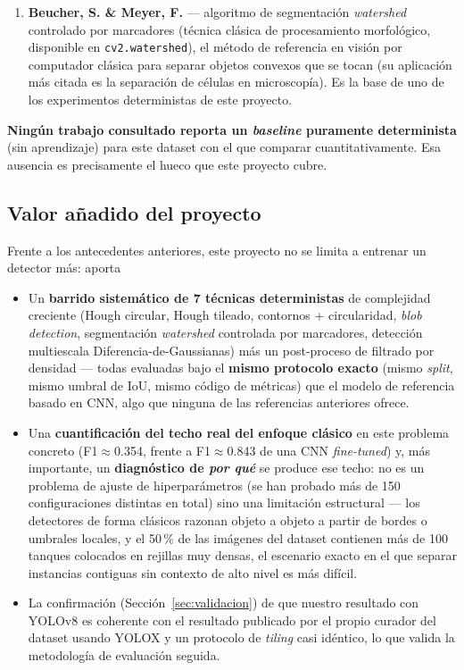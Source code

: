 \documentclass[11pt,a4paper]{article}
\begin{document}
\begin{enumerate}
    \item \textbf{Beucher, S. \& Meyer, F.} --- algoritmo de segmentación
    \emph{watershed} controlado por marcadores \cite{beucher1993watershed} (técnica
    clásica de procesamiento morfológico, disponible en \texttt{cv2.watershed}), el
    método de referencia en visión por computador clásica para separar objetos
    convexos que se tocan (su aplicación más citada es la separación de células en
    microscopía). Es la base de uno de los experimentos deterministas de este
    proyecto.
\end{enumerate}

\textbf{Ningún trabajo consultado reporta un \emph{baseline} puramente determinista}
(sin aprendizaje) para este dataset con el que comparar cuantitativamente. Esa
ausencia es precisamente el hueco que este proyecto cubre.

\subsection{Valor añadido del proyecto}

Frente a los antecedentes anteriores, este proyecto no se limita a entrenar un
detector más: aporta

\begin{itemize}
    \item Un \textbf{barrido sistemático de 7 técnicas deterministas} de complejidad
    creciente (Hough circular, Hough tileado, contornos + circularidad, \emph{blob
    detection}, segmentación \emph{watershed} controlada por marcadores, detección
    multiescala Diferencia-de-Gaussianas) más un post-proceso de filtrado por
    densidad --- todas evaluadas bajo el \textbf{mismo protocolo exacto} (mismo
    \emph{split}, mismo umbral de IoU, mismo código de métricas) que el modelo de
    referencia basado en CNN, algo que ninguna de las referencias anteriores ofrece.

    \item Una \textbf{cuantificación del techo real del enfoque clásico} en este
    problema concreto (F1$\approx$0.354, frente a F1$\approx$0.843 de una CNN
    \emph{fine-tuned}) y, más importante, un \textbf{diagnóstico de \emph{por qué}}
    se produce ese techo: no es un problema de ajuste de hiperparámetros (se han
    probado más de 150 configuraciones distintas en total) sino una limitación
    estructural --- los detectores de forma clásicos razonan objeto a objeto a partir
    de bordes o umbrales locales, y el 50\,\% de las imágenes del dataset contienen
    más de 100 tanques colocados en rejillas muy densas, el escenario exacto en el
    que separar instancias contiguas sin contexto de alto nivel es más difícil.

    \item La confirmación (Sección~\ref{sec:validacion}) de que nuestro resultado con
    YOLOv8 es coherente con el resultado publicado por el propio curador del dataset
    usando YOLOX y un protocolo de \emph{tiling} casi idéntico, lo que valida la
    metodología de evaluación seguida.
\end{itemize}
\end{document}
